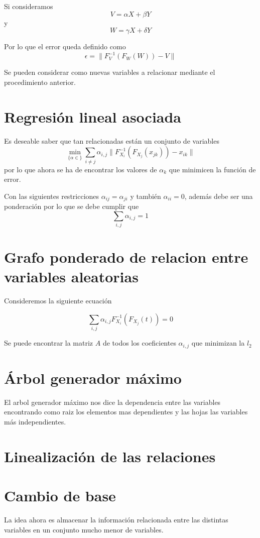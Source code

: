 \documentclass{article}
\begin{document}
Si consideramos $$V = \alpha X + \beta Y $$ y $$W = \gamma X + \delta Y $$ 

Por lo que el error queda definido como $$\epsilon = \|F^{-1}_{V}(F_W(W))-V\|$$

Se pueden considerar como nuevas variables a relacionar mediante el procedimiento anterior.

\section{Regresión lineal asociada}

Es deseable saber que tan relacionadas están un conjunto de variables
$$\min_{\{\alpha \in \}}\sum_{i\not =j} \alpha_{i,j} \|F^{-1}_{X_i}(F_{X_j}(x_{jk}))-x_{ik}\|$$ por lo que ahora se ha de encontrar los valores de $\alpha_k$ que minimicen la función de error.

Con las siguientes restricciones
$\alpha_{ij}=\alpha_{ji}$ y también $\alpha_{ii}=0$, además debe ser una ponderación por lo que se debe cumplir que $$\sum_{i,j} \alpha_{i,j} = 1$$
\section{Grafo ponderado de relacion entre variables aleatorias}
Consideremos la siguiente ecuación

$$\sum_{i,j} \alpha_{i,j} F^{-1}_{X_i}(F_{X_j}(t))=0$$

Se puede encontrar la matriz $A$ de todos los coeficientes $\alpha_{i,j}$ que minimizan la $l_2$

\section{Árbol generador máximo}
El arbol generador máximo nos dice la dependencia entre las variables encontrando como raiz los elementos mas dependientes y las hojas las variables más independientes.

\section{Linealización de las relaciones}

\section{Cambio de base}
La idea ahora es almacenar la información relacionada entre las distintas variables en un conjunto mucho menor de variables.
\end{document}
